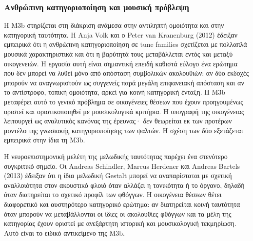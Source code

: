 \documentclass[11pt,a4paper]{article}
\begin{document}
\subsubsection{Ανθρώπινη κατηγοριοποίηση και μουσική πρόβλεψη}

Η M3b στηρίζεται στη διάκριση ανάμεσα στην αντιληπτή ομοιότητα και στην κατηγορική ταυτότητα. Η Anja Volk και ο Peter van Kranenburg (2012) έδειξαν εμπειρικά ότι η ανθρώπινη κατηγοριοποίηση σε tune families σχετίζεται με πολλαπλά μουσικά χαρακτηριστικά και ότι η βαρύτητά τους μεταβάλλεται εντός και μεταξύ οικογενειών. Η εργασία αυτή είναι σημαντική επειδή καθιστά εύλογο ένα ερώτημα που δεν μπορεί να λυθεί μόνο από απόσταση συμβολικών ακολουθιών: αν δύο εκδοχές μπορούν να αναγνωριστούν ως συγγενείς παρά μεγάλη επιφανειακή απόσταση και αν το αντίστροφο, τοπική ομοιότητα, αρκεί για κοινή κατηγορική ένταξη. Η M3b μεταφέρει αυτό το γενικό πρόβλημα σε οικογένειες θέσεων που έχουν προηγουμένως οριστεί και οριστικοποιηθεί με μουσικολογικά κριτήρια. Η υπογραφή της οικογένειας λειτουργεί ως αναλυτικός κανόνας της έρευνας· δεν θεωρείται εκ των προτέρων μοντέλο της γνωσιακής κατηγοριοποίησης των ψαλτών. Η σχέση των δύο εξετάζεται εμπειρικά στην ίδια τη M3b.

Η νευροεπιστημονική μελέτη της μελωδικής ταυτότητας παρέχει ένα στενότερο συγκριτικό σημείο. Οι Andreas Schindler, Marcus Herdener και Andreas Bartels (2013) έδειξαν ότι η ίδια μελωδική Gestalt μπορεί να αναπαρίσταται με σχετική αναλλοιότητα στον ακουστικό φλοιό όταν αλλάζει η τονικότητα ή το όργανο, δηλαδή όταν διατηρείται το σχετικό προφίλ των φθόγγων. Η οικογένεια θέσεων θέτει διαφορετικό και αυστηρότερο κατηγορικό ερώτημα: αν διατηρείται κοινή ταυτότητα όταν μπορούν να μεταβάλλονται οι ίδιες οι ακολουθίες φθόγγων και τα μέλη της κατηγορίας έχουν οριστεί με ανεξάρτητη ιστορική και μουσικολογική τεκμηρίωση. Αυτό είναι το ειδικό αντικείμενο της M3b.
\end{document}
